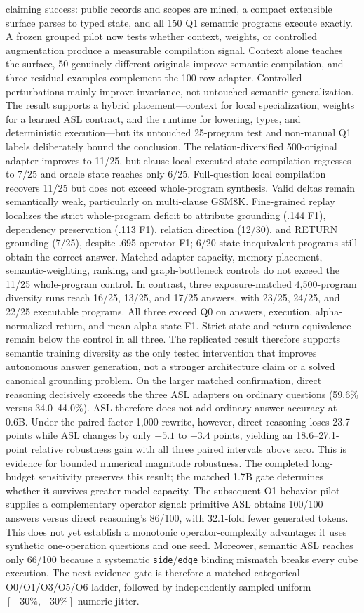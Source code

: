 \documentclass[11pt]{article}
\begin{document}
claiming success: public records and scopes are mined, a compact extensible
surface parses to typed state, and all 150 Q1 semantic programs execute exactly.
A frozen grouped pilot now tests whether context, weights, or controlled
augmentation produce a measurable compilation signal. Context alone teaches the
surface, 50 genuinely different originals improve semantic compilation, and
three residual examples complement the 100-row adapter. Controlled perturbations
mainly improve invariance, not untouched semantic generalization. The result
supports a hybrid placement---context for local specialization, weights for a
learned ASL contract, and the runtime for lowering, types, and deterministic
execution---but its untouched 25-program test and non-manual Q1 labels deliberately
bound the conclusion. The relation-diversified 500-original adapter improves to
11/25, but clause-local executed-state compilation regresses to 7/25 and oracle
state reaches only 6/25. Full-question local compilation recovers 11/25 but does
not exceed whole-program synthesis. Valid deltas remain semantically weak,
particularly on multi-clause GSM8K. Fine-grained replay localizes the strict
whole-program deficit to attribute grounding (.144 F1), dependency preservation
(.113 F1), relation direction (12/30), and RETURN grounding (7/25), despite .695
operator F1; 6/20 state-inequivalent programs still obtain the correct answer.
Matched adapter-capacity, memory-placement, semantic-weighting, ranking, and
graph-bottleneck controls do not exceed the 11/25 whole-program control. In
contrast, three exposure-matched 4,500-program diversity runs reach 16/25,
13/25, and 17/25 answers, with 23/25, 24/25, and 22/25 executable programs. All
three exceed Q0 on answers, execution, alpha-normalized return, and mean
alpha-state F1. Strict state and return equivalence remain below the control in
all three. The replicated result therefore supports semantic training diversity
as the only tested intervention that improves autonomous answer generation, not
a stronger architecture claim or a solved canonical grounding problem. On the
larger matched confirmation, direct reasoning decisively exceeds the three ASL
adapters on ordinary questions (59.6\% versus 34.0--44.0\%). ASL therefore does
not add ordinary answer accuracy at 0.6B. Under the paired factor-1,000 rewrite,
however, direct reasoning loses 23.7 points while ASL changes by only $-5.1$ to
$+3.4$ points, yielding an 18.6--27.1-point relative robustness gain with all
three paired intervals above zero. This is evidence for bounded numerical
magnitude robustness. The completed long-budget sensitivity preserves this
result; the matched 1.7B gate determines whether it survives greater model
capacity. The subsequent O1 behavior pilot supplies a complementary operator
signal: primitive ASL obtains 100/100 answers versus direct reasoning's 86/100,
with 32.1-fold fewer generated tokens. This does not yet establish a monotonic
operator-complexity advantage: it uses synthetic one-operation questions and
one seed. Moreover, semantic ASL reaches only 66/100 because a systematic
\texttt{side}/\texttt{edge} binding mismatch breaks every cube execution. The
next evidence gate is therefore a matched categorical O0/O1/O3/O5/O6 ladder,
followed by independently sampled uniform $[-30\%,+30\%]$ numeric jitter.
\end{document}
